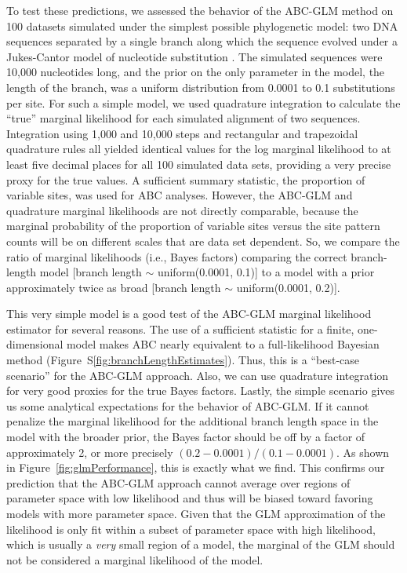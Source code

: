 To test these predictions, we assessed the behavior of the ABC-GLM method on
100 datasets simulated under the simplest possible phylogenetic model: two DNA
sequences separated by a single branch along which the sequence evolved under a
Jukes-Cantor model of nucleotide substitution \citep{JC1969}.
The simulated sequences were 10,000 nucleotides long, and the prior on the only
parameter in the model, the length of the branch, was a uniform distribution
from 0.0001 to 0.1 substitutions per site.
For such a simple model, we used quadrature integration to calculate the
``true'' marginal likelihood for each simulated alignment of two sequences.
Integration using 1,000 and 10,000 steps and rectangular and trapezoidal
quadrature rules all yielded identical values for the log marginal likelihood
to at least five decimal places for all 100 simulated data sets, providing a
very precise proxy for the true values.
A sufficient summary statistic, the proportion of variable sites, was used for
ABC analyses.
However, the ABC-GLM and quadrature marginal likelihoods are not directly
comparable, because the marginal probability of the proportion of variable
sites versus the site pattern counts will be on different scales that are data
set dependent.
So, we compare the ratio of marginal likelihoods (i.e., Bayes factors)
comparing the correct branch-length model
[branch length $\sim$ uniform(0.0001, 0.1)]
to a model with a prior approximately twice as broad
[branch length $\sim$ uniform(0.0001, 0.2)].

This very simple model is a good test of the ABC-GLM marginal likelihood
estimator for several reasons.
The use of a sufficient statistic for a finite, one-dimensional model makes ABC
nearly equivalent to a full-likelihood Bayesian method
(Figure~S\ref{fig:branchLengthEstimates}).
Thus, this is a ``best-case scenario'' for the ABC-GLM approach.
Also, we can use quadrature integration for very good proxies for the true
Bayes factors.
Lastly, the simple scenario gives us some analytical expectations for the
behavior of ABC-GLM.
If it cannot penalize the marginal likelihood for the additional branch length
space in the model with the broader prior, the Bayes factor should be off by a
factor of approximately 2, or more precisely $(0.2-0.0001) / (0.1-0.0001)$.
As shown in Figure~\ref{fig:glmPerformance}, this is exactly what we find.
This confirms our prediction that the ABC-GLM approach cannot average over
regions of parameter space with low likelihood and thus will be biased toward
favoring models with more parameter space.
Given that the GLM approximation of the likelihood is only fit within a subset
of parameter space with high likelihood, which is usually a \emph{very} small
region of a model, the marginal of the GLM should not be considered a marginal
likelihood of the model.

